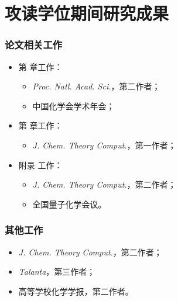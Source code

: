 
\chapter{攻读学位期间研究成果}


\subsection*{论文相关工作}

\begin{itemize}[nosep]
    \item 第  章工作：
    \begin{itemize}[nosep]
        \item \emph{Proc. Natl. Acad. Sci.}，第二作者；
        \item 中国化学会学术年会；
    \end{itemize}
    \item 第  章工作：
    \begin{itemize}[nosep]
        \item \emph{J. Chem. Theory Comput.}，第一作者；
    \end{itemize}
    \item 附录  工作：
    \begin{itemize}[nosep]
        \item \emph{J. Chem. Theory Comput.}，第二作者；
        \item 全国量子化学会议。
    \end{itemize}
\end{itemize}

\subsection*{其他工作}

\begin{itemize}[nosep]
    \item \emph{J. Chem. Theory Comput.}，第二作者；
    \item \emph{Talanta}，第三作者；
    \item 高等学校化学学报，第二作者。
\end{itemize}


